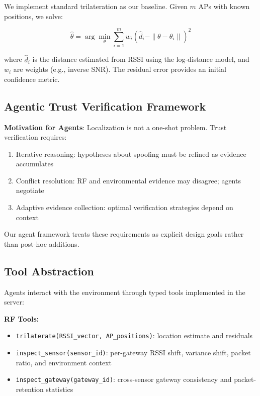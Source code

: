 \documentclass[10pt, twocolumn, letterpaper]{article}
\begin{document}
We implement standard trilateration as our baseline. Given $m$ APs with known positions, we solve:

\begin{equation}
\hat{\theta} = \arg\min_{\theta} \sum_{i=1}^m w_i \left( \hat{d}_i - \|\theta - \theta_i\| \right)^2
\end{equation}

where $\hat{d}_i$ is the distance estimated from RSSI using the log-distance model, and $w_i$ are weights (e.g., inverse SNR). The residual error provides an initial confidence metric.

\subsection{Agentic Trust Verification Framework}

\textbf{Motivation for Agents}: Localization is not a one-shot problem. Trust verification requires:
\begin{enumerate}
    \item Iterative reasoning: hypotheses about spoofing must be refined as evidence accumulates
    \item Conflict resolution: RF and environmental evidence may disagree; agents negotiate
    \item Adaptive evidence collection: optimal verification strategies depend on context
\end{enumerate}

Our agent framework treats these requirements as explicit design goals rather than post-hoc additions.


\subsection{Tool Abstraction}

Agents interact with the environment through typed tools implemented in the server:

\textbf{RF Tools:}
\begin{itemize}
    \item \texttt{trilaterate(RSSI\_vector, AP\_positions)}: location estimate and residuals
    \item \texttt{inspect\_sensor(sensor\_id)}: per-gateway RSSI shift, variance shift, packet ratio, and environment context
    \item \texttt{inspect\_gateway(gateway\_id)}: cross-sensor gateway consistency and packet-retention statistics
\end{itemize}
\end{document}
